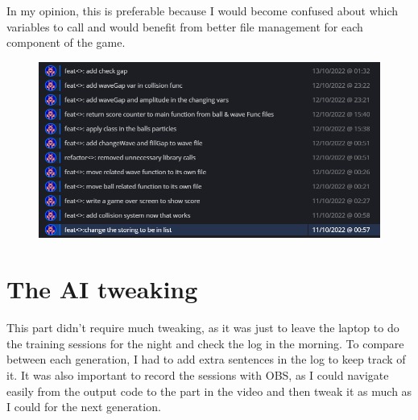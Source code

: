 In my opinion, this is preferable because I would become confused about which variables to call and would benefit from better file management for each component of the game. 
\begin{figure}[H]
	\centering
	\includegraphics[width=0.7\linewidth]{usedImages/repoEncapsulation}
	\caption[Time it took to implement the new layout in encapsulation]{}
	\label{fig:repoencapsulation}
\end{figure}


\section{The AI tweaking}

This part didn't require much tweaking, as it was just to leave the laptop to do the training sessions for the night and check the log in the morning. To compare between each generation, I had to add extra  sentences in the log to keep track of it. It was also important to record the sessions with OBS, as I could navigate easily from the output code to the part in the video and then tweak it as much as I could for the next generation.
